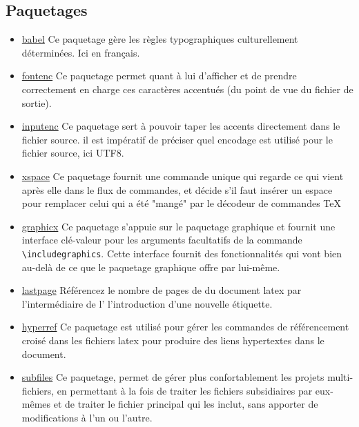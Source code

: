 \subsection{Paquetages}

\begin{itemize}
    \item \href{https://www.ctan.org/pkg/babel}{babel} Ce paquetage gère les règles
          typographiques culturellement déterminées. Ici en français.
    \item \href{https://ctan.org/pkg/fontenc}{fontenc} Ce paquetage permet quant à lui d’afficher et de
          prendre correctement en charge ces caractères accentués (du point de vue du fichier de sortie).
    \item \href{https://www.ctan.org/pkg/inputenc}{inputenc} Ce paquetage sert à pouvoir taper les accents
          directement dans le fichier source. il est impératif de préciser quel encodage est utilisé pour le fichier
          source, ici UTF8.
    \item \href{https://www.ctan.org/pkg/inputenc}{xspace} Ce paquetage fournit une commande unique qui regarde ce
          qui vient après elle dans le flux de commandes, et décide s'il faut insérer un espace pour remplacer
          celui qui a été "mangé" par le décodeur de commandes TeX
    \item \href{https://www.ctan.org/pkg/graphicx}{graphicx} Ce paquetage s'appuie sur
          le paquetage graphique et fournit une interface clé-valeur pour les arguments
          facultatifs de la commande \verb=\includegraphics=. Cette interface fournit des
          fonctionnalités qui vont bien au-delà de ce que le paquetage graphique offre par lui-même.
    \item \href{https://www.ctan.org/pkg/lastpage}{lastpage} Référencez le nombre de pages de du
          document \gls{latex} par l'intermédiaire de l'
          l'introduction d'une nouvelle étiquette.
    \item \href{https://www.ctan.org/pkg/hyperref}{hyperref} Ce paquetage est utilisé
          pour gérer les commandes de référencement croisé dans les fichiers
          \gls{latex} pour produire des liens hypertextes dans le document.
    \item \href{https://www.ctan.org/pkg/subfiles}{subfiles} Ce paquetage, permet de gérer plus confortablement les projets
          multi-fichiers, en permettant à la fois de traiter les fichiers subsidiaires par eux-mêmes et de traiter le
          fichier principal qui les inclut, sans apporter de modifications à l'un ou l'autre.

\end{itemize}
